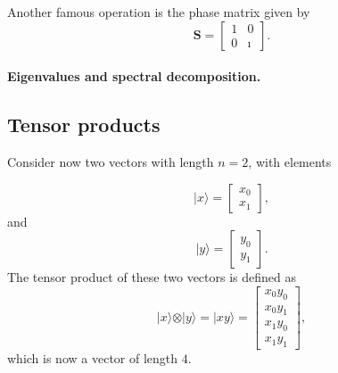 Another famous operation is the phase matrix given by
\[
\bm{S} = \begin{bmatrix} 1 & 0 \\ 0 & \imath\end{bmatrix}.
\]

\paragraph{Eigenvalues and spectral decomposition.}
\subsection*{Tensor products}

Consider now two vectors with length $n=2$, with elements

\[
\vert x \rangle = \begin{bmatrix} x_0 \\ x_1 \end{bmatrix}, 
\]
and
\[
\vert y \rangle = \begin{bmatrix} y_0 \\ y_1 \end{bmatrix}. 
\]
The tensor product of these two vectors is defined as
\[
\vert x \rangle \otimes \vert y \rangle = \vert xy \rangle  = \begin{bmatrix} x_0y_0 \\ x_0y_1 \\ x_1y_0 \\ x_1y_1 \end{bmatrix}, 
\]
which is now a vector of length $4$.

